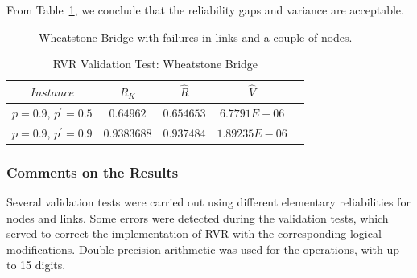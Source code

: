 From Table~\ref{rvrTable6}, we conclude that the reliability gaps and variance are acceptable. 
\begin{figure}[H]
\begin{center}
\caption{Wheatstone Bridge with failures in links and a couple of nodes. \label{rvrVI}}
\end{center}
\end{figure}

\begin{table}[H]
\caption{RVR Validation Test: Wheatstone Bridge} %
\centering  %
\begin{tabular}{|c|c|c|c|c|} %
\hline	$Instance$   &	$R_{K}$ & $\hat{R}$&  $\hat{V}$ \\
\hline	$p=0.9$, $p^{\prime}=0.5$	& $0.64962$ &	$0.654653$ 	&	$6.7791E-06$	\\
\hline	$p=0.9$, $p^{\prime}=0.9$	& $0.9383688$ &	$0.937484$ 	&	$1.89235E-06$	\\
\hline
\end{tabular}
\label{rvrTable6} %
\end{table}

\subsubsection*{Comments on the Results}
Several validation tests were carried out using different elementary reliabilities for nodes and links. 
Some errors were detected during the validation tests, which served to correct the implementation of RVR with 
the corresponding logical modifications. Double-precision arithmetic was used for the operations, with up to 15 digits.